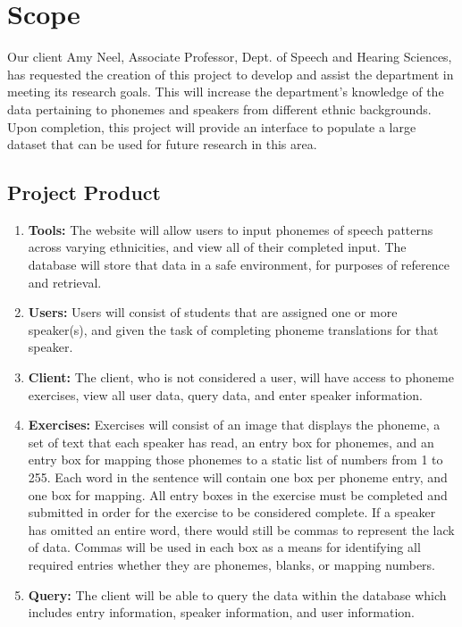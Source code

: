 \documentclass[12pt, a4paper, oneside]{article}
\begin{document}
\section*{Scope}
Our client Amy Neel, Associate Professor, Dept. of Speech and Hearing Sciences, has requested the creation of this project to develop and assist the department in meeting its research goals. This will increase the department’s knowledge of the data pertaining to phonemes and speakers from different ethnic backgrounds. Upon completion, this project will provide an interface to populate a large dataset that can be used for future research in this area. \\

\subsection*{Project Product}
\begin{enumerate}
\item \textbf{Tools:} The website will allow users to input phonemes of speech patterns across varying ethnicities, and view all of their completed input. The database will store that data in a safe environment, for purposes of reference and retrieval. 
 
\item \textbf{Users:} Users will consist of students that are assigned one or more speaker(s), and given the task of completing phoneme translations for that speaker.

\item \textbf{Client:} The client, who is not considered a user, will have access to phoneme exercises, view all user data, query data, and enter speaker information. 
\item \textbf{Exercises:} Exercises will consist of an image that displays the phoneme, a set of text that each speaker has read, an entry box for phonemes, and an entry box for mapping those phonemes to a static list of numbers from 1 to 255. Each word in the sentence will contain one box per phoneme entry, and one box for mapping. All entry boxes in the exercise must be completed and submitted in order for the exercise to be considered complete. If a speaker has omitted an entire word, there would still be commas to represent the lack of data. Commas will be used in each box as a means for identifying all required entries whether they are phonemes, blanks, or mapping numbers.

\item \textbf{Query:} The client will be able to query the data within the database which includes entry information, speaker information, and user information.
\end{enumerate}
\end{document}
